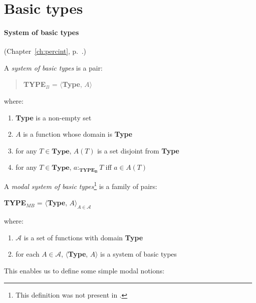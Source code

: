 

\section{Basic types}
\label{sec:basic}

\paragraph{System of basic types} (Chapter~\ref{ch:percint}, p.~\pageref{ex:def-basic-types}.)

A {\it system of basic types\/} is a pair:
\begin{quote}
{\bf TYPE$_B$} = $\langle${\bf Type}, $A$$\rangle$
\end{quote}
where:
\begin{enumerate} 
 
\item \textbf{Type} is a non-empty set 
 
\item $A$ is a function whose domain is \textbf{Type}

\item for any $T\in\textbf{Type}$, $A(T)$ is a set disjoint from
  \textbf{Type}

\item for any $T\in\textbf{Type}$, $a:_{\mathbf{TYPE_B}}T$ iff $a\in A(T)$
 
\end{enumerate}


A \textit{modal system of basic types}\footnote{This definition was not present in \cite{Cooper2012}.} is a family of
pairs:
\begin{display}
\textbf{TYPE$_{\mathit{MB}}$} = $\langle${\bf Type},
$A\rangle_{A\in\mathcal{A}}$
\end{display}
where:
\begin{enumerate} 
 
\item $\mathcal{A}$ is a set of functions with domain \textbf{Type} 
 
\item for each $A\in\mathcal{A}$, $\langle${\bf Type}, $A\rangle$ is a
  system of basic types
 
\end{enumerate} 

This enables us to define some simple modal notions:

